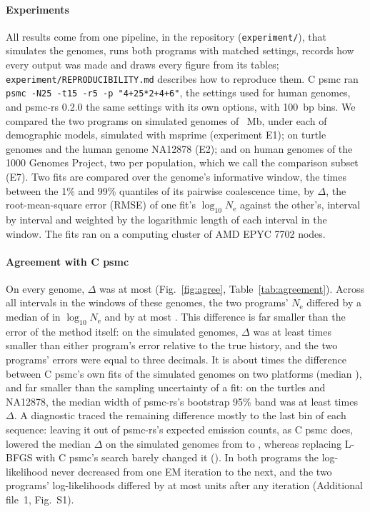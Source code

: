 \documentclass[a4paper,num-refs,gigabyte]{oup-contemporary}%
\newcommand{\psmcrs}{psmc-rs}
\newcommand{\Ne}{\ensuremath{N_\mathrm{e}}}
\begin{document}
\paragraph{Experiments} All results come from one pipeline, in the repository (\texttt{experiment/}), that simulates the genomes, runs both programs with matched settings, records how every output was made and draws every figure from its tables; \texttt{experiment/REPRODUCIBILITY.md} describes how to reproduce them. C psmc ran \texttt{psmc -N25 -t15 -r5 -p "4+25*2+4+6"}, the settings \citet{li2011} used for human genomes, and \psmcrs{} 0.2.0 the same settings with its own options, with 100~bp bins. We compared the two programs on \EoneGenomes{} simulated genomes of \EoneGenomeMb{}~Mb, \EoneReps{} under each of \EoneModelsW{} demographic models, simulated with msprime \citep{kelleher2016,baumdicker2022} (experiment E1); on \EtwoTurtlesW{} turtle genomes \citep{hilgers2025} and the human genome NA12878 (E2); and on \EsevenDefault{} human genomes of the 1000 Genomes Project, two per population, which we call the comparison subset (E7). Two fits are compared over the genome's informative window, the times between the 1\% and 99\% quantiles of its pairwise coalescence time, by $\Delta$, the root-mean-square error (RMSE) of one fit's $\log_{10}\Ne$ against the other's, interval by interval and weighted by the logarithmic length of each interval in the window. The fits ran on a computing cluster of AMD EPYC 7702 nodes.

\paragraph{Agreement with C psmc} On every genome, $\Delta$ was at most \EtwoRsCRmseMax{} (Fig.~\ref{fig:agree}, Table~\ref{tab:agreement}). Across all \AgreeIntervals{} intervals in the windows of these \AgreeGenomes{} genomes, the two programs' \Ne{} differed by a median of \AgreeMedianAbs{} in $\log_{10}\Ne$ and by at most \AgreeMaxPct{}. This difference is far smaller than the error of the method itself: on the simulated genomes, $\Delta$ was at least \EoneFoldMin{} times smaller than either program's error relative to the true history, and the two programs' errors were equal to three decimals. It is about \DiagOverCBuildsW{} times the difference between C psmc's own fits of the simulated genomes on two platforms (median \DiagCBuildsMedian{}), and far smaller than the sampling uncertainty of a fit: on the turtles and NA12878, the median width of \psmcrs{}'s bootstrap 95\% band was at least \EtwoBandOverDeltaMin{} times $\Delta$. A diagnostic traced the remaining difference mostly to the last bin of each sequence: leaving it out of \psmcrs{}'s expected emission counts, as C psmc does, lowered the median $\Delta$ on the simulated genomes from \DiagMedianDefault{} to \DiagMedianLastBin{}, whereas replacing L-BFGS with C psmc's search barely changed it (\DiagMedianHookeJeeves{}). In both programs the log-likelihood never decreased from one EM iteration to the next, and the two programs' log-likelihoods differed by at most \EoneSoneDiffMax{} units after any iteration (Additional file~1, Fig.~S1).
\end{document}
